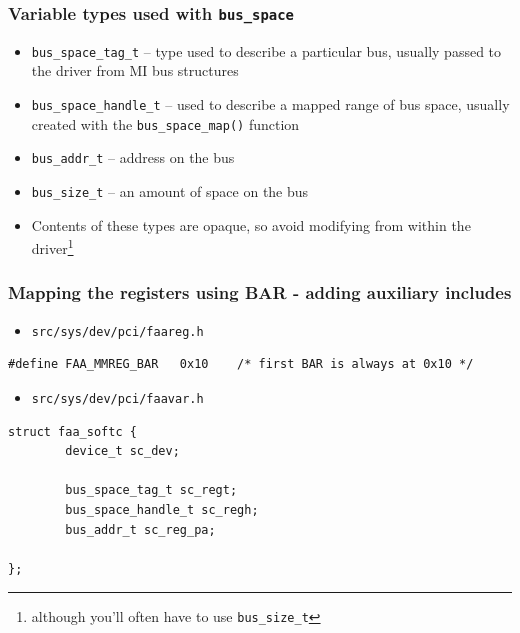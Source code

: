 \documentclass[dvipsnames,table]{beamer}
\begin{document}
\begin{frame}
\frametitle{Variable types used with {\tt bus\_space}}

\begin{itemize}
         \item {\tt bus\_space\_tag\_t} -- type used to describe a particular bus, usually passed to the driver from MI bus structures
         \item {\tt bus\_space\_handle\_t} --  used to describe a mapped range of bus space, usually created with the {\tt bus\_space\_map()} function
         \item {\tt bus\_addr\_t} -- address on the bus
         \item {\tt bus\_size\_t} -- an amount of space on the bus
         \item Contents of these types are opaque, so avoid modifying from within the driver\footnote{although you'll often have to use {\tt bus\_size\_t}}
\end{itemize}
\end{frame}



\begin{frame}[fragile]
\frametitle{Mapping the registers using BAR - adding auxiliary includes}
\scriptsize
\begin{itemize}
	\item {\tt src/sys/dev/pci/faareg.h}
\end{itemize}
\begin{lstlisting}
#define FAA_MMREG_BAR   0x10	/* first BAR is always at 0x10 */
\end{lstlisting}
\begin{itemize}
	\item {\tt src/sys/dev/pci/faavar.h}
\end{itemize}
\begin{lstlisting}
struct faa_softc {
        device_t sc_dev;

        bus_space_tag_t sc_regt;
        bus_space_handle_t sc_regh;
        bus_addr_t sc_reg_pa;

};
\end{lstlisting}
\end{frame}
\end{document}
